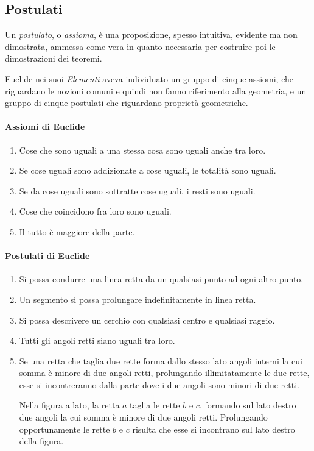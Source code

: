 \subsection{Postulati}

Un \emph{postulato}, o \emph{assioma}, è una proposizione, spesso intuitiva, evidente ma non dimostrata, ammessa come vera in quanto necessaria per costruire poi le dimostrazioni dei teoremi.

Euclide nei suoi \emph{Elementi} aveva individuato un gruppo di cinque assiomi, che riguardano le nozioni comuni e quindi non fanno riferimento alla geometria, e un gruppo di cinque postulati che riguardano proprietà geometriche.

\paragraph{Assiomi di Euclide}
\begin{enumerate}[label=\Roman{*}.]
\item Cose che sono uguali a una stessa cosa sono uguali anche tra loro.
\item Se cose uguali sono addizionate a cose uguali, le totalità sono uguali.
\item Se da cose uguali sono sottratte cose uguali, i resti sono uguali.
\item Cose che coincidono fra loro sono uguali.
\item Il tutto è maggiore della parte.
\end{enumerate}

\paragraph{Postulati di Euclide}
\begin{enumerate}[label=\Roman{*}.]
\item Si possa condurre una linea retta da un qualsiasi punto ad ogni altro punto.
\item Un segmento si possa prolungare indefinitamente in linea retta.
\item Si possa descrivere un cerchio con qualsiasi centro e qualsiasi raggio.
\item Tutti gli angoli retti siano uguali tra loro.
\item Se una retta che taglia due rette forma dallo stesso lato angoli interni la cui somma è minore di due angoli retti, prolungando illimitatamente le due rette, esse si incontreranno dalla parte dove i due angoli sono minori di due retti.

 \begin{minipage}{.45\textwidth}
 \centering
 \end{minipage}\hfil
 \begin{minipage}{.45\textwidth}
 Nella figura a lato, la retta $a$ taglia le rette $b$ e $c$, formando sul lato destro due angoli la cui somma è minore di due angoli retti. Prolungando opportunamente le rette $b$ e $c$ risulta che esse si incontrano sul lato destro della figura.
  \end{minipage}
\end{enumerate}

